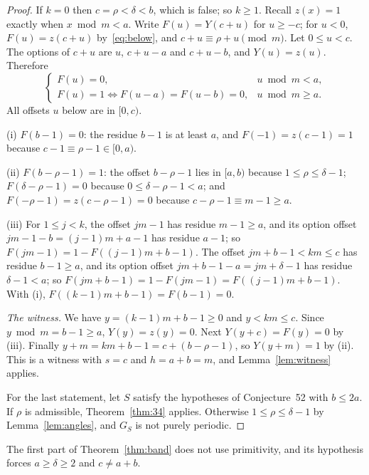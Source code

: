 \documentclass[11pt]{amsart}
\theoremstyle{definition}
\numberwithin{equation}{section}
\begin{document}
\begin{proof}
If $k=0$ then $c=\rho<\delta<b$, which is false; so $k\ge1$. Recall $z(x)=1$ exactly when
$x\bmod m<a$. Write $F(u)=Y(c+u)$ for $u\ge-c$; for $u<0$, $F(u)=z(c+u)$
by~\eqref{eq:below}, and $c+u\equiv\rho+u\pmod m$. Let $0\le u<c$. The options of $c+u$ are
$u$, $c+u-a$ and $c+u-b$, and $Y(u)=z(u)$. Therefore
\begin{equation}\label{eq:Frec}
\begin{cases}
F(u)=0, & u\bmod m<a,\\
F(u)=1\iff F(u-a)=F(u-b)=0, & u\bmod m\ge a.
\end{cases}
\end{equation}
All offsets $u$ below are in $[0,c)$.

(i) $F(b-1)=0$: the residue $b-1$ is at least $a$, and $F(-1)=z(c-1)=1$ because
$c-1\equiv\rho-1\in[0,a)$.

(ii) $F(b-\rho-1)=1$: the offset $b-\rho-1$ lies in $[a,b)$ because $1\le\rho\le\delta-1$;
$F(\delta-\rho-1)=0$ because $0\le\delta-\rho-1<a$; and $F(-\rho-1)=z(c-\rho-1)=0$ because
$c-\rho-1\equiv m-1\ge a$.

(iii) For $1\le j<k$, the offset $jm-1$ has residue $m-1\ge a$, and its option offset
$jm-1-b=(j-1)m+a-1$ has residue $a-1$; so $F(jm-1)=1-F((j-1)m+b-1)$. The offset
$jm+b-1<km\le c$ has residue $b-1\ge a$, and its option offset $jm+b-1-a=jm+\delta-1$ has
residue $\delta-1<a$; so $F(jm+b-1)=1-F(jm-1)=F((j-1)m+b-1)$. With (i),
$F((k-1)m+b-1)=F(b-1)=0$.

\emph{The witness.} We have $y=(k-1)m+b-1\ge0$ and $y<km\le c$. Since $y\bmod m=b-1\ge a$,
$Y(y)=z(y)=0$. Next $Y(y+c)=F(y)=0$ by (iii). Finally $y+m=km+b-1=c+(b-\rho-1)$, so
$Y(y+m)=1$ by (ii). This is a witness with $s=c$ and $h=a+b=m$, and Lemma~\ref{lem:witness}
applies.

For the last statement, let $S$ satisfy the hypotheses of Conjecture~52 with $b\le2a$. If
$\rho$ is admissible, Theorem~\ref{thm:34} applies. Otherwise $1\le\rho\le\delta-1$ by
Lemma~\ref{lem:angles}, and $G_S$ is not purely periodic.
\end{proof}

The first part of Theorem~\ref{thm:band} does not use primitivity, and its hypothesis forces
$a\ge\delta\ge2$ and $c\ne a+b$.
\end{document}
